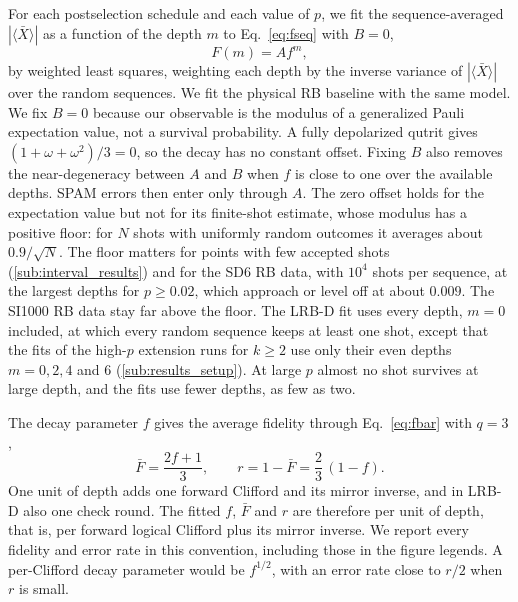 For each postselection schedule and each value of $p$, we fit the sequence-averaged $|\langle \bar{X} \rangle|$ as a function of the depth $m$ to Eq.~\eqref{eq:fseq} with $B = 0$,
\begin{equation}
    F(m) = A f^{m},
    \label{eq:zero_offset_fit}
\end{equation}
by weighted least squares, weighting each depth by the inverse variance of $|\langle \bar{X} \rangle|$ over the random sequences. We fit the physical RB baseline with the same model. We fix $B = 0$ because our observable is the modulus of a generalized Pauli expectation value, not a survival probability. A fully depolarized qutrit gives $(1 + \omega + \omega^2)/3 = 0$, so the decay has no constant offset. Fixing $B$ also removes the near-degeneracy between $A$ and $B$ when $f$ is close to one over the available depths. SPAM errors then enter only through $A$. The zero offset holds for the expectation value but not for its finite-shot estimate, whose modulus has a positive floor: for $N$ shots with uniformly random outcomes it averages about $0.9/\sqrt{N}$. The floor matters for points with few accepted shots (\autoref{sub:interval_results}) and for the SD6 RB data, with $10^4$ shots per sequence, at the largest depths for $p \ge 0.02$, which approach or level off at about $0.009$. The SI1000 RB data stay far above the floor. The LRB-D fit uses every depth, $m = 0$ included, at which every random sequence keeps at least one shot, except that the fits of the high-$p$ extension runs for $k \ge 2$ use only their even depths $m = 0, 2, 4$ and $6$ (\autoref{sub:results_setup}). At large $p$ almost no shot survives at large depth, and the fits use fewer depths, as few as two.

The decay parameter $f$ gives the average fidelity through Eq.~\eqref{eq:fbar} with $q = 3$,
\begin{equation}
    \bar{F} = \frac{2f + 1}{3}, \qquad r = 1 - \bar{F} = \frac{2}{3}\,(1 - f) .
    \label{eq:error_rate}
\end{equation}
One unit of depth adds one forward Clifford and its mirror inverse, and in LRB-D also one check round. The fitted $f$, $\bar{F}$ and $r$ are therefore per unit of depth, that is, per forward logical Clifford plus its mirror inverse. We report every fidelity and error rate in this convention, including those in the figure legends. A per-Clifford decay parameter would be $f^{1/2}$, with an error rate close to $r/2$ when $r$ is small.

